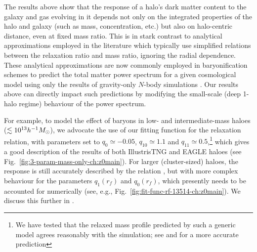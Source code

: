 The results above show that the response of a halo's dark matter content to the galaxy and gas evolving in it depends not only on the integrated properties of the halo and galaxy (such as mass, concentration, etc.) but also on halo-centric distance, even at fixed mass ratio. This is in stark contrast to analytical approximations employed in the literature which typically use simplified  relations between the relaxation ratio and mass ratio, ignoring the radial dependence. These analytical approximations are now commonly employed in baryonification schemes to predict the total matter power spectrum for a given cosmological model using only the results of gravity-only $N$-body simulations \citep{2015JCAP...12..049S,2018MNRAS.480.3962C,2021MNRAS.503.3596A}. Our results above can directly impact such predictions by modifying the small-scale (deep 1-halo regime) behaviour of the power spectrum. 

For example, to model the effect of baryons in low- and intermediate-mass haloes ($\lesssim10^{13}h^{-1}M_{\odot}$), we advocate the use of our fitting function  for the relaxation relation, with parameters set to $q_0\simeq-0.05$, $q_{10}\simeq1.1$ and $q_{11}\simeq0.5$,\footnote{We have tested that the relaxed mass profile predicted by such a generic model agrees reasonably with the simulation; see  and  for a more accurate prediction} which gives a good description of the results of both IllustrisTNG and EAGLE haloes (see Fig.~\ref{fig:3-param-mass-only-ch:z0main}). For larger (cluster-sized) haloes, the response is still accurately described by the relation , but with more complex behaviour for the parameters $q_1(r_f)$ and $q_0(r_f)$, which presently needs to be accounted for numerically (see, e.g., Fig.~\ref{fig:fit-func-rf-13514-ch:z0main}). We discuss this further in .









